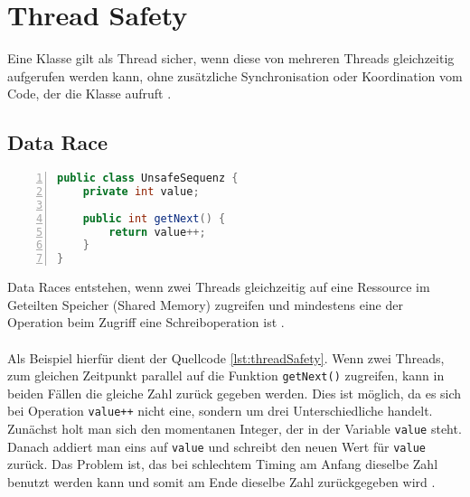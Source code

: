 \section{Thread Safety}\label{sec:threadSafety}

Eine Klasse gilt als Thread sicher, wenn diese von mehreren Threads gleichzeitig aufgerufen werden kann, ohne zusätzliche Synchronisation oder Koordination vom Code, der die Klasse aufruft \cite[vgl.][12]{brian}.



\subsection*{Data Race}
\begin{lstlisting}[language=Java,frame=tb,caption={Non-thread-safe Sequence Generator \cite{brian}}, label={lst:threadSafety}, numbers=left, stepnumber=1, captionpos=b, tabsize=4]
public class UnsafeSequenz {
	private int value;
	
	public int getNext() {
		return value++;
	}
}
\end{lstlisting}

Data Races entstehen, wenn zwei Threads gleichzeitig auf eine Ressource im Geteilten Speicher (Shared Memory) zugreifen und mindestens eine der Operation beim Zugriff eine Schreiboperation ist \cite[vgl.][72]{banerjee_theory_2006}.\\ 
\\
Als Beispiel hierfür dient der Quellcode \ref{lst:threadSafety}. Wenn zwei Threads, zum gleichen Zeitpunkt parallel auf die Funktion \texttt{getNext()} zugreifen, kann in beiden Fällen die gleiche Zahl zurück gegeben werden. Dies ist möglich, da es sich bei Operation \texttt{value++} nicht eine, sondern um drei Unterschiedliche handelt. Zunächst holt man sich den momentanen Integer, der in der Variable \texttt{value} steht. Danach addiert man eins auf \texttt{value} und schreibt den neuen Wert für \texttt{value} zurück. Das Problem ist, das bei schlechtem Timing am Anfang dieselbe Zahl benutzt werden kann und somit am Ende dieselbe Zahl zurückgegeben wird \cite[vgl.][5]{brian}.


